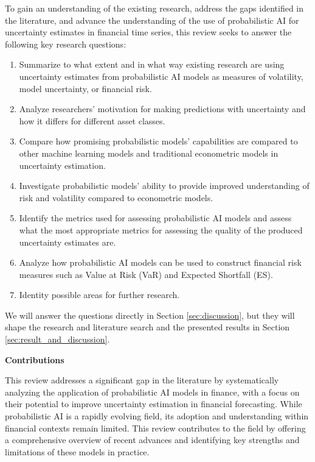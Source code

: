 To gain an understanding of the existing research, address the gaps identified in the literature, and advance the understanding of the use of probabilistic AI for uncertainty estimates in financial time series, this review seeks to answer the following key research questions: 
\begin{enumerate}[label=RQ\arabic*:]
    \item Summarize to what extent and in what way existing research are using uncertainty estimates from probabilistic AI models as measures of volatility, model uncertainty, or financial risk.
    \item Analyze researchers' motivation for making predictions with uncertainty and how it differs for different asset classes.
    \item Compare how promising probabilistic models' capabilities are compared to other machine learning models and traditional econometric models in uncertainty estimation.
    \item Investigate probabilistic models' ability to provide improved understanding of risk and volatility compared to econometric models.
    \item Identify the metrics used for assessing probabilistic AI models and assess what the most appropriate metrics for assessing the quality of the produced uncertainty estimates are.
    \item Analyze how probabilistic AI models can be used to construct financial risk measures such as Value at Risk (VaR) and Expected Shortfall (ES).
    \item Identity possible areas for further research.
\end{enumerate}

We will answer the questions directly in Section \ref{sec:discussion}, but they will shape the research and literature search and the presented results in Section \ref{sec:result_and_discussion}. 

 
\textbf{Contributions}\nopagebreak

This review addresses a significant gap in the literature by systematically analyzing the application of probabilistic AI models in finance, with a focus on their potential to improve uncertainty estimation in financial forecasting. While probabilistic AI is a rapidly evolving field, its adoption and understanding within financial contexts remain limited. This review contributes to the field by offering a comprehensive overview of recent advances and identifying key strengths and limitations of these models in practice.

